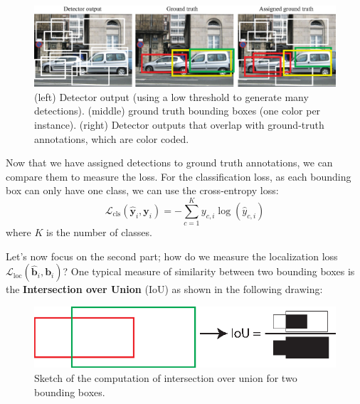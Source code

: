 \begin{figure}
    \centerline{
        \includegraphics[width=1\linewidth]{figures/object_recognition/detections.eps}
    }
    \caption{%
        (left) Detector output (using a low threshold to generate many detections). (middle) ground truth bounding boxes (one color per instance). (right) Detector outputs that overlap with ground-truth annotations, which are color coded.}
\end{figure}

Now that we have assigned detections to ground truth annotations, we can compare them to measure the loss. For the classification loss, as each bounding box can only have one class, we can use the cross-entropy loss:
\begin{equation}
    \mathcal{L}_{\text{cls}}(\hat{\mathbf{y}}_i, \mathbf{y}_i)
    = -  \sum_{c=1}^{K} y_{c,i} \log(\hat{y}_{c,i})
\end{equation}
where $K$ is the number of classes.

Let's now focus on the second part; how do we measure the localization loss $\mathcal{L}_{\text{loc}} (\hat{\mathbf{b}}_i, \mathbf{b}_i)$? One typical measure of similarity between two bounding boxes is the {\bf Intersection over Union} (IoU) as shown in the following drawing:

\begin{figure}
    \centerline{
        \includegraphics[width=0.5\linewidth]{figures/object_recognition/iou.eps}
    }
    \caption{Sketch of the computation of intersection over union for two bounding boxes.}
\end{figure}

